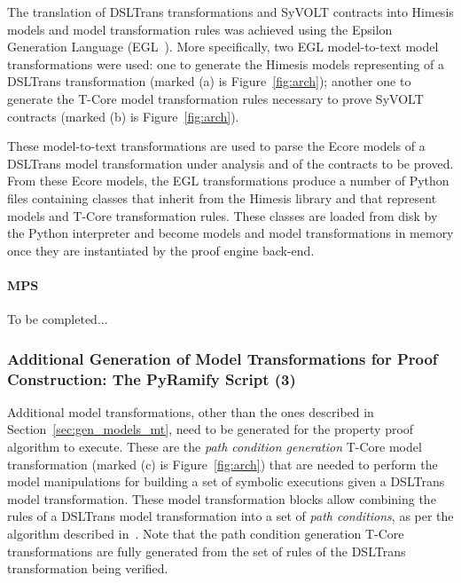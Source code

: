 The translation of DSLTrans transformations and SyVOLT contracts into Himesis
models and model transformation rules was achieved using the Epsilon Generation
Language (EGL~\cite{Rose2008}). More specifically, two EGL model-to-text model
transformations were used: one to generate the Himesis models representing of a DSLTrans transformation (marked (a) is
Figure~\ref{fig:arch}); another one to generate the T-Core model transformation
rules necessary to prove SyVOLT contracts (marked (b) is Figure~\ref{fig:arch}).

These model-to-text transformations are used to parse the Ecore models of a
DSLTrans model transformation under analysis and of the contracts to be proved.
From these Ecore models, the EGL transformations produce a number of Python
files containing classes that inherit from the Himesis library and that
represent models and T-Core transformation rules. These classes are loaded from
disk by the Python interpreter and become models and model transformations in
memory once they are instantiated by the proof engine back-end.


\paragraph{MPS}

To be completed...

\subsubsection{Additional Generation of Model Transformations for Proof
Construction: The PyRamify Script (3)}

Additional model transformations, other than the ones described in
Section~\ref{sec:gen_models_mt}, need to be generated for the property proof
algorithm to execute. These are the \emph{path condition generation} T-Core
model transformation (marked (c) is Figure~\ref{fig:arch}) that are
needed to perform the model manipulations for building a set of symbolic
executions given a DSLTrans model transformation. These model transformation
blocks allow combining the rules of a DSLTrans model
transformation into a set of \emph{path conditions}, as per the algorithm
described in~\cite{Lucio2014}. Note that the path condition generation T-Core
transformations are fully generated from the set of rules of the DSLTrans
transformation being verified.

